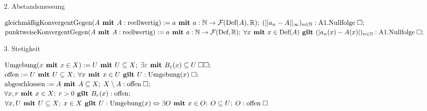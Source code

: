\documentclass{article}
\begin{document}
\begin{flashcard}[]{2. Abstandsmessung}




\backside

$\text{gleichmäßigKonvergentGegen} (A \textbf{ \textup{mit} \allowbreak}  A:\text{reellwertig}) := a \textbf{ \textup{mit} \allowbreak} a:\mathbb{N} \rightarrow \mathcal{F}(\text{Def}(A), \mathbb{R}); \; (||a_{n} - A||_{\infty})_{n \in \mathbb{N}} : \text{A1.Nullfolge} \; \Box;$\\
$\text{punktweiseKonvergentGegen}(A \textbf{ \textup{mit} \allowbreak} A:\text{reellwertig}) := a \textbf{ \textup{mit} \allowbreak} a:\mathbb{N} \rightarrow \mathcal{F}(\text{Def}, \mathbb{R}); \; \forall x \textbf{ \textup{mit} \allowbreak} x \in \text{Def}(A) \textbf{ \textup{gilt} \allowbreak} (|a_{n}(x) - A(x)|)_{n \in \mathbb{N}} : \text{A1.Nullfolge} \; \Box;$

\backside

\end{flashcard}


\begin{flashcard}{3. Stetigkeit}


\backside

$\text{Umgebung}(x \textbf{ \textup{mit} \allowbreak} x \in X) := U \textbf{ \textup{mit} \allowbreak} U \subseteq X; \; \exists \varepsilon \textbf{ \textup{mit} \allowbreak} B_{\varepsilon}(x) \subseteq U \; \Box \Box ;$\\

$\text{offen} := U \textbf{ \textup{mit} \allowbreak} U \subseteq X; \; \forall x \textbf{ \textup{mit} \allowbreak} x \in U \textbf{ \textup{gilt} \allowbreak} U : \text{Umgebung}(x) \; \Box ;$\\

$\text{abgeschlossen} := A \textbf{ \textup{mit} \allowbreak} A \subseteq X; \; X \setminus A : \text{offen} \; \Box ;$\\

$\forall x, r \textbf{ \textup{mit} \allowbreak} x \in X; \; r > 0 \textbf{ \textup{gilt} \allowbreak} B_{r}(x) : \text{offen};$\\

$\forall x, U \textbf{ \textup{mit} \allowbreak} U \subseteq X; \; x \in X \textbf{ \textup{gilt} \allowbreak} U : \text{Umgebung}(x) \Leftrightarrow \exists O \textbf{ \textup{mit} \allowbreak} x \in O; \; O \subseteq U; \; O : \text{offen} \; \Box$\\

\end{flashcard}
\end{document}
